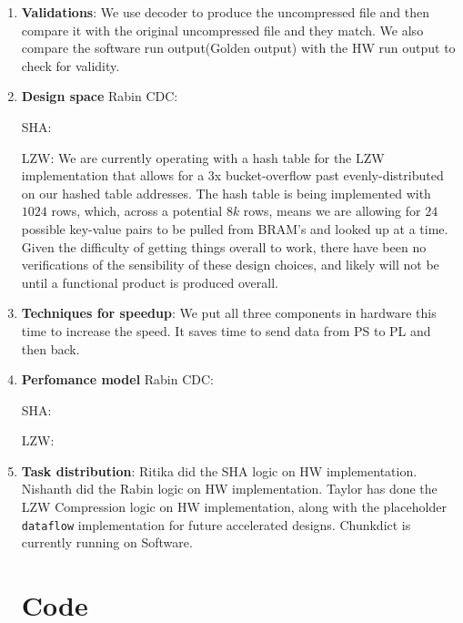 \documentclass{article}
\begin{document}
\begin{enumerate}
\item%
\textbf{Validations}: We use decoder to produce the uncompressed file and then compare it with the original uncompressed file and they match. 
We also compare the software run output(Golden output) with the HW run output to check for validity. 
\newline

\item%
\textbf{Design space}\newline
Rabin CDC:\newline

\newline
SHA:\newline

\newline
LZW:\newline
We are currently operating with a hash table for the LZW implementation that allows for a 3x bucket-overflow past evenly-distributed on our hashed table addresses. The hash table is being implemented with $1024$ rows, which, across a potential $8k$ rows, means we are allowing for $24$ possible key-value pairs to be pulled from BRAM's and looked up at a time. 
Given the difficulty of getting things overall to work, there have been no verifications of the sensibility of these design choices, and likely will not be until a functional product is produced overall.

\newline

\item%
\textbf{Techniques for speedup}: We put all three components in hardware this time to increase the speed. It saves time to send data from PS to PL and then back. 
\newline


\item%
\textbf{Perfomance model}
Rabin CDC:


SHA:


LZW:
\newline


\item%
\textbf{Task distribution}: 
Ritika did the SHA logic on HW implementation. 
Nishanth did the Rabin logic on HW implementation.
Taylor has done the LZW Compression logic on HW implementation, along with the placeholder \texttt{dataflow} implementation for future accelerated designs.
Chunkdict is currently running on Software. 
\newline

\section{Code}


\end{enumerate}
\end{document}
